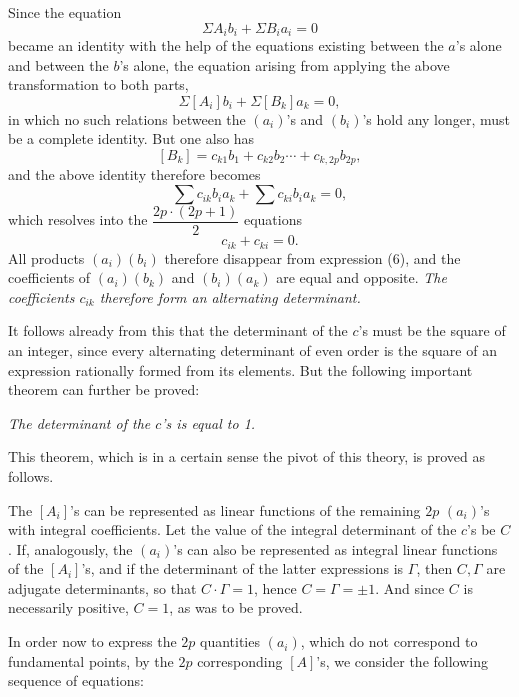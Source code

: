 \documentclass[10pt]{article}
\begin{document}
Since the equation
\[
\Sigma A_i b_i+\Sigma B_i a_i=0
\]
became an identity with the help of the equations existing between the \(a\)'s alone and between the \(b\)'s alone, the equation arising from applying the above transformation to both parts,
\[
\Sigma[A_i]b_i+\Sigma[B_k]a_k=0,
\]
in which no such relations between the \((a_i)\)'s and \((b_i)\)'s hold any longer, must be a complete identity. But one also has
\[
[B_k]=c_{k1}b_1+c_{k2}b_2\cdots+c_{k,2p}b_{2p},
\]
and the above identity therefore becomes
\[
\sum c_{ik}b_i a_k+\sum c_{ki}b_i a_k=0,
\]
which resolves into the \(\dfrac{2p\cdot(2p+1)}{2}\) equations
\[
c_{ik}+c_{ki}=0.
\]
All products \((a_i)(b_i)\) therefore disappear from expression (6), and the coefficients of \((a_i)(b_k)\) and \((b_i)(a_k)\) are equal and opposite. \emph{The coefficients \(c_{ik}\) therefore form an alternating determinant.}

It follows already from this that the determinant of the \(c\)'s must be the square of an integer, since every alternating determinant of even order is the square of an expression rationally formed from its elements. But the following important theorem can further be proved:

\begin{center}
\emph{The determinant of the \(c\)'s is equal to 1.}
\end{center}

This theorem, which is in a certain sense the pivot of this theory, is proved as follows.

The \([A_i]\)'s can be represented as linear functions of the remaining \(2p\) \((a_i)\)'s with integral coefficients. Let the value of the integral determinant of the \(c\)'s be \(C\). If, analogously, the \((a_i)\)'s can also be represented as integral linear functions of the \([A_i]\)'s, and if the determinant of the latter expressions is \(\Gamma\), then \(C,\Gamma\) are adjugate determinants, so that \(C\cdot\Gamma=1\), hence \(C=\Gamma=\pm1\). And since \(C\) is necessarily positive, \(C=1\), as was to be proved.

In order now to express the \(2p\) quantities \((a_i)\), which do not correspond to fundamental points, by the \(2p\) corresponding \([A]\)'s, we consider the following sequence of equations:
\end{document}
